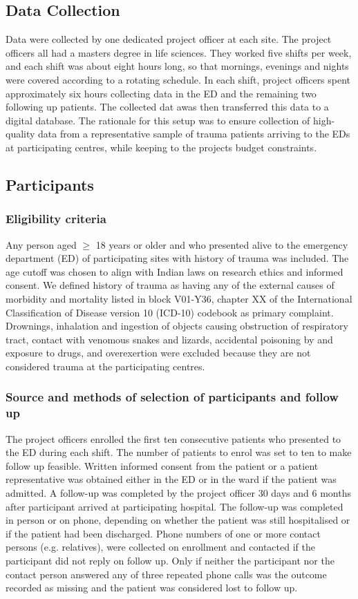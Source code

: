 \documentclass[10pt,letterpaper]{article}\usepackage[]{graphicx}\usepackage[]{color}
\begin{document}
\subsection*{Data Collection}
Data were collected by one dedicated project officer at each site. The project
officers all had a masters degree in life sciences. They worked five shifts per
week, and each shift was about eight hours long, so that mornings, evenings and
nights were covered according to a rotating schedule. In each shift, project
officers spent approximately six hours collecting data in the ED and the
remaining two following up patients. The collected dat awas then transferred
this data to a digital database. The rationale for this setup was to ensure
collection of high-quality data from a representative sample of trauma patients
arriving to the EDs at participating centres, while keeping to the projects
budget constraints.

\subsection*{Participants}
\subsubsection*{Eligibility criteria}
Any person aged $\geq$ 18 years or older and who presented alive to the
emergency department (ED) of participating sites with history of trauma was
included. The age cutoff was chosen to align with Indian laws on research ethics
and informed consent. We defined history of trauma as having any of the external
causes of morbidity and mortality listed in block V01-Y36, chapter XX of the
International Classification of Disease version 10 (ICD-10) codebook as primary
complaint. Drownings, inhalation and ingestion of objects causing obstruction of
respiratory tract, contact with venomous snakes and lizards, accidental
poisoning by and exposure to drugs, and overexertion were excluded because they
are not considered trauma at the participating centres.

\subsubsection*{Source and methods of selection of participants and follow up}
The project officers enrolled the first ten consecutive patients who presented
to the ED during each shift. The number of patients to enrol was set to ten to
make follow up feasible. Written informed consent from the patient or a patient
representative was obtained either in the ED or in the ward if the patient was
admitted. A follow-up was completed by the project officer 30 days and 6 months
after participant arrived at participating hospital. The follow-up was completed
in person or on phone, depending on whether the patient was still hospitalised
or if the patient had been discharged. Phone numbers of one or more contact
persons (e.g. relatives), were collected on enrollment and contacted if the
participant did not reply on follow up. Only if neither the participant nor the
contact person answered any of three repeated phone calls was the outcome
recorded as missing and the patient was considered lost to follow up.
\end{document}

